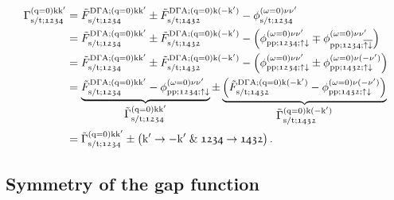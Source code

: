 \documentclass[../../main.tex]{subfiles}
\begin{document}
\begin{align}\label{eq:pairing_vertex_full_formula}
\begin{split}
	\Gamma_{\text{s}/\text{t};\mathfrak{1234}}^{(\text{q}=0)\text{k}\text{k}'}&=\tilde{F}_{\text{s}/\text{t};\mathfrak{1234}}^{\text{D}\Gamma\text{A};(\text{q}=0)\text{k}\text{k}'}\pm \tilde{F}_{\text{s}/\text{t};\mathfrak{1432}}^{\text{D}\Gamma\text{A};(\text{q}=0)\text{k}(-\text{k}')}-\phi_{\text{s}/\text{t};\mathfrak{1234}}^{(\omega=0)\nu\nu'}\\
	&=\tilde{F}_{\text{s}/\text{t};\mathfrak{1234}}^{\text{D}\Gamma\text{A};(\text{q}=0)\text{k}\text{k}'}\pm \tilde{F}_{\text{s}/\text{t};\mathfrak{1432}}^{\text{D}\Gamma\text{A};(\text{q}=0)\text{k}(-\text{k}')}-\left (\phi_{\text{pp};\mathfrak{1234};\uparrow\downarrow}^{(\omega=0)\nu\nu'}\mp \phi_{\text{pp};\mathfrak{1234};\overline{\uparrow\downarrow}}^{(\omega=0)\nu\nu'}\right )\\
	&=\tilde{F}_{\text{s}/\text{t};\mathfrak{1234}}^{\text{D}\Gamma\text{A};(\text{q}=0)\text{k}\text{k}'}\pm \tilde{F}_{\text{s}/\text{t};\mathfrak{1432}}^{\text{D}\Gamma\text{A};(\text{q}=0)\text{k}(-\text{k}')}-\left (\phi_{\text{pp};\mathfrak{1234};\uparrow\downarrow}^{(\omega=0)\nu\nu'}\pm \phi_{\text{pp};\mathfrak{1432};\uparrow\downarrow}^{(\omega=0)\nu(-\nu')}\right )\\
	&=\underbrace{\tilde{F}_{\text{s}/\text{t};\mathfrak{1234}}^{\text{D}\Gamma\text{A};(\text{q}=0)\text{k}\text{k}'}-\phi_{\text{pp};\mathfrak{1234};\uparrow\downarrow}^{(\omega=0)\nu\nu'}}_{\textstyle\tilde{\Gamma}_{\text{s}/\text{t};\mathfrak{1234}}^{(\text{q}=0)\text{k}\text{k}'}}\pm \underbrace{\left (\tilde{F}_{\text{s}/\text{t};\mathfrak{1432}}^{\text{D}\Gamma\text{A};(\text{q}=0)\text{k}(-\text{k}')}- \phi_{\text{pp};\mathfrak{1432};\uparrow\downarrow}^{(\omega=0)\nu(-\nu')}\right )}_{\textstyle\tilde{\Gamma}_{\text{s}/\text{t};\mathfrak{1432}}^{(\text{q}=0)\text{k}(-\text{k}')}}\\
	&=\tilde{\Gamma}_{\text{s}/\text{t};\mathfrak{1234}}^{(\text{q}=0)\text{k}\text{k}'}\pm \left (\text{k}'\rightarrow -\text{k}'\;\&\; \mathfrak{1234}\rightarrow\mathfrak{1432}\right ).
\end{split}
\end{align}

\subsection{Symmetry of the gap function}
\end{document}
